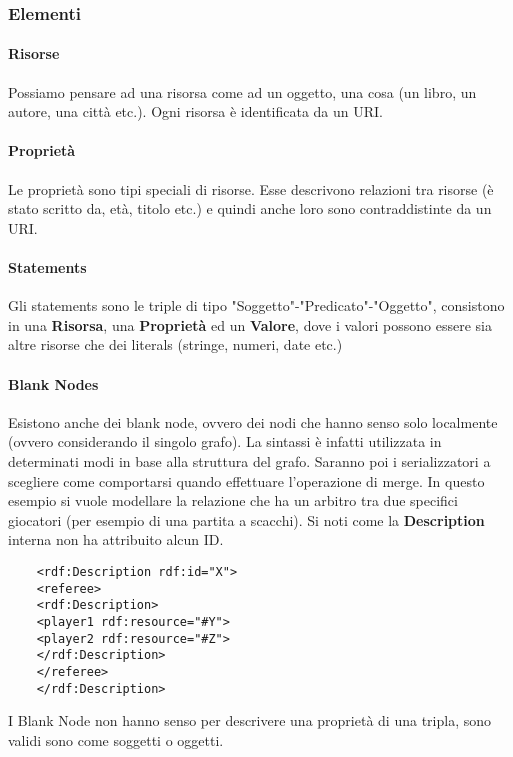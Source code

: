 \subsubsection{Elementi}
\paragraph{Risorse}
Possiamo pensare ad una risorsa come ad un oggetto, una cosa (un libro, un autore, una città etc.). Ogni risorsa è identificata da un URI.
\paragraph{Proprietà}
Le proprietà sono tipi speciali di risorse. Esse descrivono relazioni tra risorse (è stato scritto da, età, titolo etc.) e quindi anche loro sono contraddistinte da un URI. 
\paragraph{Statements}
Gli statements sono le triple di tipo "Soggetto"-"Predicato"-"Oggetto", consistono in una \textbf{Risorsa}, una \textbf{Proprietà} ed un \textbf{Valore}, dove i valori possono essere sia altre risorse che dei literals (stringe, numeri, date etc.)
\paragraph{Blank Nodes}
Esistono anche dei blank node, ovvero dei nodi che hanno senso solo localmente (ovvero considerando il singolo grafo). La sintassi è infatti utilizzata in determinati modi in base alla struttura del grafo. Saranno poi i serializzatori a scegliere come comportarsi quando effettuare l'operazione di merge. In questo esempio si vuole modellare la relazione che ha un arbitro tra due specifici giocatori (per esempio di una partita a scacchi). Si noti come la \textbf{Description} interna non ha attribuito alcun ID.
\begin{verbatim}
	<rdf:Description rdf:id="X">
	<referee>
	<rdf:Description>
	<player1 rdf:resource="#Y">
	<player2 rdf:resource="#Z">
	</rdf:Description>
	</referee>
	</rdf:Description>
\end{verbatim}
I Blank Node non hanno senso per descrivere una proprietà di una tripla, sono validi sono come soggetti o oggetti.
